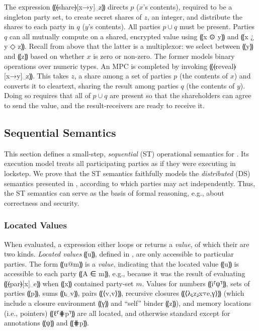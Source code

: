 The \mpc expression ⸨⦑share⦒[x→y]␣z⸩ directs $p$ ($x$'s contents),
required to be a singleton party set, to create secret shares of $z$,
an integer, and distribute the shares to each party in
$q$ ($y$'s contents). All parties $p \cup q$ must be present.
Parties $q$ can all mutually compute on a shared, encrypted value
using ⸨x {⊙} y⸩ and ⸨x {¿} y {◇} z⸩.  Recall from above that the latter is a
multiplexor: we select between ⸨y⸩ and ⸨z⸩ based on whether $x$ is zero or
non-zero. The former models binary operations over numeric types.
An MPC is completed by invoking ⸨⦑reveal⦒[x→y]␣z⸩. This takes $z$, a share
among a set of parties $p$ (the contents of $x$) and converts it to cleartext,
sharing the result among parties $q$ (the contents of $y$). Doing so requires that all of
$p \cup q$ are present so that the shareholders can agree to send the value,
and the result-receivers are ready to receive it.

\subsection{Sequential Semantics}
\label{subsec:mpc-design-seq}

This section defines a small-step, \emph{sequential} (ST)
operational semantics for \mpc. Its execution model treats all
participating parties as if they were executing in lockstep.
We prove that the ST semantics faithfully models the \emph{distributed} (DS)
semantics presented in , according to which parties may act
independently. Thus, the ST semantics can serve as the basis of \mpc formal reasoning,
e.g., about correctness and security.


\subsubsection{Located Values}
\label{subsubsec:mpc-design-seq-val}

When evaluated, a \mpc expression either loops or returns a \emph{value},
of which their are two kinds. \emph{Located values} ⸨u⸩, defined in
, are only accessible to particular parties. The form
⸨u@m⸩ is a \emph{value}, indicating that the located value ⸨u⸩ is
accessible to each party ⸨A ∈ m⸩, e.g., because it was the result of
evaluating ⸨⦑par⦒[x]␣e⸩ when ⸨x⸩ contained party-set $m$. Values for numbers ⸨i⸢ψ⸣⸩, sets of parties
⸨p⸩, sums ⸨ιᵢ␣v⸩, pairs ⸨⟨v,v⟩⸩, recursive closures ⸨⟨λ⸤z⸥x⍪e,γ⟩⸩ (which include
a closure environment ⸨γ⸩ and “self” binder ⸨z⸩), and memory locations (i.e.,
pointers) ⸨ℓ⸢⋕p⸣⸩ are all located, and otherwise standard except for annotations
⸨ψ⸩ and ⸨⋕p⸩.

